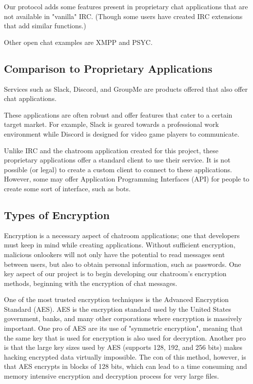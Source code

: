 \documentclass{article}
\begin{document}
Our protocol adds some features present in proprietary chat applications that are not available in "vanilla" IRC. (Though some users have created IRC extensions that add similar functions.)

Other open chat examples are XMPP and PSYC. 

\subsection{Comparison to Proprietary Applications}

Services such as Slack, Discord, and GroupMe are products offered that also offer chat applications. 

These applications are often robust and offer features that cater to a certain target market. For example, Slack is geared towards a professional work environment while Discord is designed for video game players to communicate. 

Unlike IRC and the chatroom application created for this project, these proprietary applications offer a standard client to use their service. It is not possible (or legal) to create a custom client to connect to these applications. However, some may offer Application Programming Interfaces (API) for people to create some sort of interface, such as bots. 

\subsection{Types of Encryption}

Encryption is a necessary aspect of chatroom applications; one that developers must keep in mind while creating applications. Without sufficient encryption, malicious onlookers will not only have the potential to read messages sent between users, but also to obtain personal information, such as passwords. One key aspect of our project is to begin developing our chatroom's encryption methods, beginning with the encryption of chat messages. 

One of the most trusted encryption techniques is the Advanced Encryption Standard (AES). AES is the encryption standard used by the United States government, banks, and many other corporations where encryption is massively important. One pro of AES are its use of "symmetric encryption", meaning that the same key that is used for encryption is also used for decryption. Another pro is that the large key sizes used by AES (supports 128, 192, and 256 bits) makes hacking encrypted data virtually impossible. The con of this method, however, is that AES encrypts in blocks of 128 bits, which can lead to a time consuming and memory intensive encryption and decryption process for very large files. 
\end{document}
